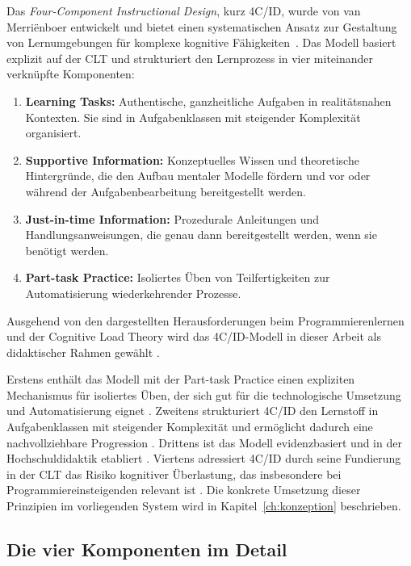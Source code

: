 Das \textit{Four-Component Instructional Design}, kurz 4C/ID, wurde von van Merriënboer entwickelt und bietet einen systematischen Ansatz zur Gestaltung von Lernumgebungen für komplexe kognitive Fähigkeiten~\cite{vanmerrienboer2018, vanmerrienboer2003}. Das Modell basiert explizit auf der CLT und strukturiert den Lernprozess in vier miteinander verknüpfte Komponenten:

\begin{enumerate}
    \item \textbf{Learning Tasks:} Authentische, ganzheitliche Aufgaben in realitätsnahen Kontexten. Sie sind in Aufgabenklassen mit steigender Komplexität organisiert.
    \item \textbf{Supportive Information:} Konzeptuelles Wissen und theoretische Hintergründe, die den Aufbau mentaler Modelle fördern und vor oder während der Aufgabenbearbeitung bereitgestellt werden.
    \item \textbf{Just-in-time Information:} Prozedurale Anleitungen und Handlungsanweisungen, die genau dann bereitgestellt werden, wenn sie benötigt werden.
    \item \textbf{Part-task Practice:} Isoliertes Üben von Teilfertigkeiten zur Automatisierung wiederkehrender Prozesse.
\end{enumerate}

Ausgehend von den dargestellten Herausforderungen beim Programmierenlernen und der Cog\-nitive Load Theory wird das 4C/ID-Modell in dieser Arbeit als didaktischer Rahmen gewählt \cite{vanmerrienboer2018, vanmerrienboer2003}. 

Erstens enthält das Modell mit der Part-task Practice einen expliziten Mechanismus für isoliertes Üben, der sich gut für die technologische Umsetzung und Automatisierung eignet \cite{vanmerrienboer2018}. 
Zweitens strukturiert 4C/ID den Lernstoff in Aufgabenklassen mit steigender Komplexität und ermöglicht dadurch eine nachvollziehbare Progression \cite{vanmerrienboer2018, vanmerrienboer2003}. 
Drittens ist das Modell evidenzbasiert und in der Hochschuldidaktik etabliert \cite{frerejean2019}. 
Viertens adressiert 4C/ID durch seine Fundierung in der CLT das Risiko kognitiver Überlastung, das insbesondere bei Programmiereinsteigenden relevant ist \cite{sweller1998, vanmerrienboer2018}.
Die konkrete Umsetzung dieser Prinzipien im vorliegenden System wird in Kapitel~\ref{ch:konzeption} beschrieben.


\subsection{Die vier Komponenten im Detail}\label{subsec:4cid-komponenten}

